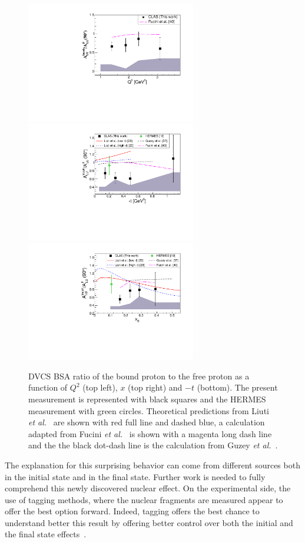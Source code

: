 \documentclass[aps,prc,preprint,superscriptaddress]{revtex4}
\begin{document}
\begin{figure}[tbp!]
\center
\includegraphics[width=7.4cm]{fig3/ALU_ratioInc_Q2_shortscenrario.pdf}
\includegraphics[width=7.4cm]{fig3/ALU_ratioInc_t_shortscenrario.pdf}
\includegraphics[width=7.4cm]{fig3/ALU_ratioInc_x_shortscenrario.pdf}
	\caption{DVCS BSA ratio of the bound proton to the free proton as a function of 
	$Q^2$ (top left), $x$ (top right) and $-t$ (bottom). The present measurement is 
	represented with black squares and the HERMES 
	measurement \cite{Airapetian:2009cga} with green circles. Theoretical predictions 
	from Liuti {\it et al.}~\cite{Liuti:2005gi,GonzalezHernandez:2012jv} are shown 
	with red full line and dashed blue, a calculation adapted from Fucini 
	{\it et al.}~\cite{Fucini:2019xlc} is shown with a magenta long dash line and the
	the black dot-dash line is the calculation from Guzey {\it et al.}~\cite{Guzey:2008th}.}
\label{fig:IncRatios}
\end{figure}

The explanation for this surprising behavior can come from different sources
both in the initial state and in the final state. 
Further work is needed to fully comprehend this newly discovered nuclear effect. On the 
experimental side, the use of tagging methods, where the nuclear fragments are measured
appear to offer the best option forward. Indeed, tagging offers the best chance to understand better
this result by offering better control over both the initial and the final state 
effects~\cite{Dupre:2015jha}.
\end{document}
